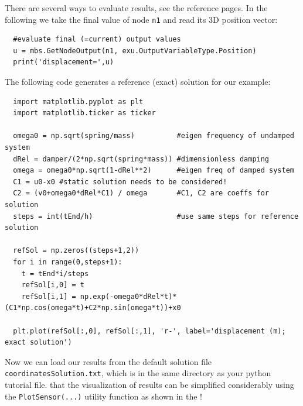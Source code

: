 There are several ways to evaluate results, see the reference pages. In the following we take the final value of node \texttt{n1} and read its 3D position vector:
\pythonstyle\begin{lstlisting}
  #evaluate final (=current) output values
  u = mbs.GetNodeOutput(n1, exu.OutputVariableType.Position)
  print('displacement=',u)
\end{lstlisting}
%
The following code generates a reference (exact) solution for our example:
\pythonstyle\begin{lstlisting}
  import matplotlib.pyplot as plt
  import matplotlib.ticker as ticker

  omega0 = np.sqrt(spring/mass)          #eigen frequency of undamped system
  dRel = damper/(2*np.sqrt(spring*mass)) #dimensionless damping
  omega = omega0*np.sqrt(1-dRel**2)      #eigen freq of damped system
  C1 = u0-x0 #static solution needs to be considered!
  C2 = (v0+omega0*dRel*C1) / omega       #C1, C2 are coeffs for solution
  steps = int(tEnd/h)                    #use same steps for reference solution

  refSol = np.zeros((steps+1,2))
  for i in range(0,steps+1):
    t = tEnd*i/steps
    refSol[i,0] = t
    refSol[i,1] = np.exp(-omega0*dRel*t)*(C1*np.cos(omega*t)+C2*np.sin(omega*t))+x0

  plt.plot(refSol[:,0], refSol[:,1], 'r-', label='displacement (m); exact solution')
\end{lstlisting}
%
Now we can load our results from the default solution file \texttt{coordinatesSolution.txt}, which is in the same
directory as your python tutorial file. 
 that the visualization of results can be simplified considerably using the \texttt{PlotSensor(...)} utility function as shown in the !


